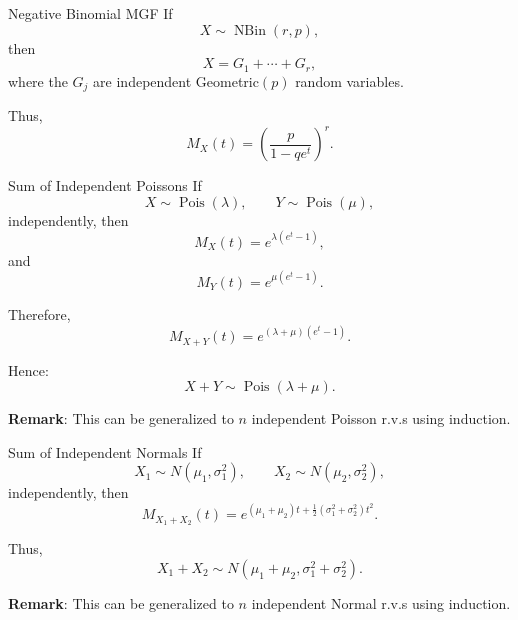 \begin{frame}{Negative Binomial MGF}
If
\[
X\sim \operatorname{NBin}(r,p),
\]
then
\[
X
=
G_1+\cdots+G_r,
\]
where the $G_j$ are independent Geometric$(p)$ random variables.

\vspace{0.25cm}

Thus,
\[
{
M_X(t)
=
\left(
\frac{p}{1-qe^t}
\right)^r.
}
\]
\end{frame}




\begin{frame}{Sum of Independent Poissons}
If
\[
X\sim \operatorname{Pois}(\lambda),
\qquad
Y\sim \operatorname{Pois}(\mu),
\]
independently, then
\[
M_X(t)=e^{\lambda(e^t-1)},
\]
and
\[
M_Y(t)=e^{\mu(e^t-1)}.
\]

Therefore,
\[
M_{X+Y}(t)
=
e^{(\lambda+\mu)(e^t-1)}.
\]

Hence:
\[
{
X+Y\sim \operatorname{Pois}(\lambda+\mu).
}
\]

\textbf{Remark}: This can be generalized to $n$ independent Poisson r.v.s using induction.
\end{frame}

\begin{frame}{Sum of Independent Normals}
If
\[
X_1\sim N(\mu_1,\sigma_1^2),
\qquad
X_2\sim N(\mu_2,\sigma_2^2),
\]
independently, then
\[
M_{X_1+X_2}(t)
=
e^{(\mu_1+\mu_2)t
+\frac12(\sigma_1^2+\sigma_2^2)t^2}.
\]

Thus,
\[
{
X_1+X_2
\sim
N(\mu_1+\mu_2,\sigma_1^2+\sigma_2^2).
}
\]


\textbf{Remark}: This can be generalized to $n$ independent Normal r.v.s using induction.

\end{frame}







